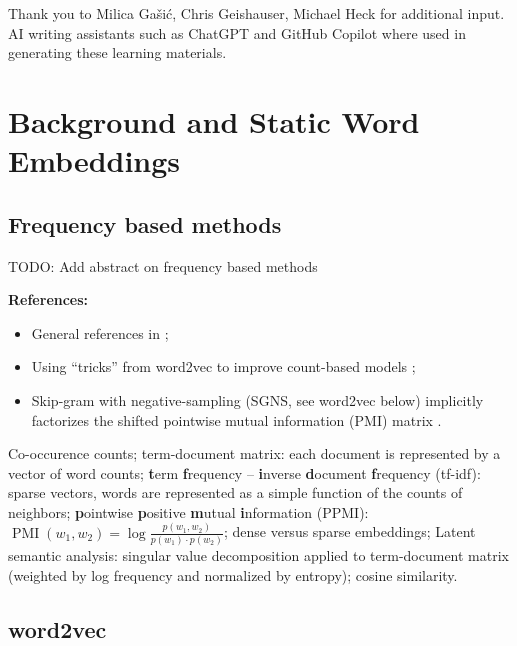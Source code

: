 \documentclass[11pt, a4paper]{amsart}
\begin{document}
\noindent Thank you to Milica Gašić, Chris Geishauser, Michael Heck for additional input. \\
AI writing assistants such as ChatGPT and GitHub Copilot where used in generating these learning materials. \\

\section{Background and Static Word Embeddings}
\label{sec:static_word_embeddings}


\subsection{Frequency based methods}

TODO: Add abstract on frequency based methods

\noindent \textbf{References:}
\begin{itemize}
    \item General references in ;
    \item Using ``tricks'' from word2vec to improve count-based models \cite{levy-etal-2015-improving};
    \item Skip-gram with negative-sampling (SGNS, see word2vec below) implicitly factorizes the shifted pointwise mutual information (PMI) matrix \cite{NIPS2014_feab05aa}.
\end{itemize}

{
	\color{blue}
	
	Co-occurence counts;
	term-document matrix: each document is represented by a vector of word counts;
	\textbf{t}erm \textbf{f}requency -- \textbf{i}nverse \textbf{d}ocument \textbf{f}requency (tf-idf):
	sparse vectors, words are represented as a simple function of the counts of neighbors;
	\textbf{p}ointwise \textbf{p}ositive \textbf{m}utual \textbf{i}nformation (PPMI):
	$\operatorname{PMI}(w_{1}, w_{2}) = \log \frac{p(w_{1}, w_{2})}{p(w_{1}) \cdot p(w_{2})}$;
	dense versus sparse embeddings;
	Latent semantic analysis:
	singular value decomposition applied to term-document matrix (weighted by log frequency and normalized by entropy);
	cosine similarity.
} %

\subsection{word2vec}
\end{document}

